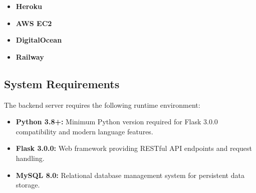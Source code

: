 \begin{itemize}
    \item \textbf{Heroku} %
    
    \item \textbf{AWS EC2} %
    
    \item \textbf{DigitalOcean} %
    
    \item \textbf{Railway} %
\end{itemize}

\subsection{System Requirements}

The backend server requires the following runtime environment:

\begin{itemize}
    \item \textbf{Python 3.8+:} Minimum Python version required for Flask 3.0.0 compatibility and modern language features.
    \item \textbf{Flask 3.0.0:} Web framework providing RESTful API endpoints and request handling.
    \item \textbf{MySQL 8.0:} Relational database management system for persistent data storage.
\end{itemize}




